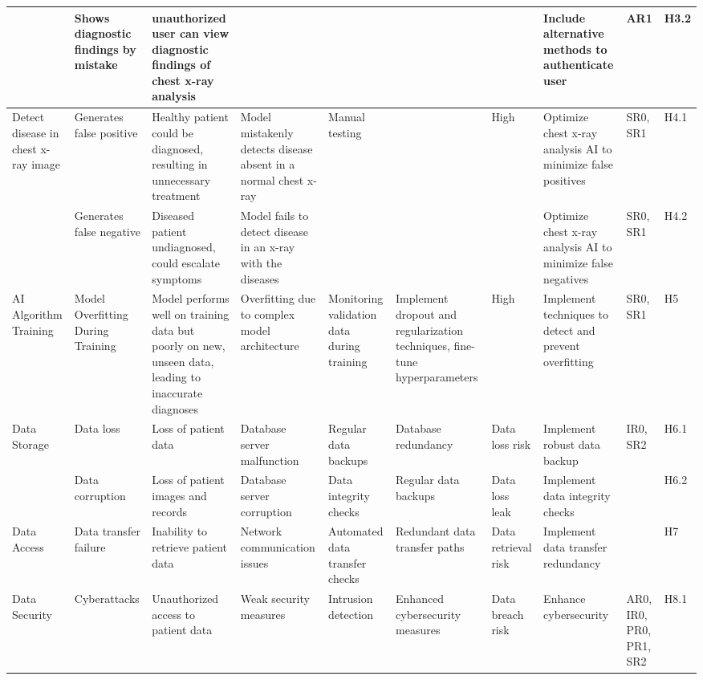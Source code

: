 \documentclass{article}
\begin{document}
\begin{landscape}
\begin{table}[hp]
\begin{footnotesize}
\begin{tabular}{|p{1in}|p{1in}|p{1in}|p{1.5in}|p{0.6in}|p{0.5in}|p{0.3in}|p{2.5in}|p{0.2in}|p{0.2in}|}
        \cline{2-3}\cline{8-10}
        & Shows diagnostic findings by mistake & unauthorized user can view diagnostic findings of chest x-ray analysis & & & & & Include alternative methods to authenticate user & AR1 & H3.2 \\
        \hline
        \multirow{2}{1in}{Detect disease in chest x-ray image} & Generates false positive & Healthy patient could be diagnosed, resulting in unnecessary treatment & Model mistakenly detects disease absent in a normal chest x-ray & \multirow{2}{0.6in}{Manual testing} & & \multirow{2}{0.3in}{High} & Optimize chest x-ray analysis AI to minimize false positives & SR0, SR1 & H4.1 \\
        \cline{2-4}\cline{8-10}
        & Generates false negative & Diseased patient undiagnosed, could escalate symptoms & Model fails to detect disease in an x-ray with the diseases & & & & Optimize chest x-ray analysis AI to minimize false negatives & SR0, SR1 & H4.2 \\
        \hline
        AI Algorithm Training & Model Overfitting During Training & Model performs well on training data but poorly on new, unseen data, leading to inaccurate diagnoses & Overfitting due to complex model architecture & Monitoring validation data during training & Implement dropout and regularization techniques, fine-tune hyperparameters & High & Implement techniques to detect and prevent overfitting & SR0, SR1 & H5 \\
        \hline
        \multirow{2}{1in}{Data Storage} & Data loss & Loss of patient data & Database server malfunction & Regular data backups & Database redundancy & Data loss risk & Implement robust data backup & \multirow{2}{0.2in}{IR0, SR2} & H6.1 \\
        \cline{2-8}\cline{10-10}
        & Data corruption & Loss of patient images and records & Database server corruption & Data integrity checks & Regular data backups & Data loss leak & Implement data integrity checks & & H6.2 \\
        \hline
        Data Access & Data transfer failure & Inability to retrieve patient data & Network communication issues & Automated data transfer checks & Redundant data transfer paths & Data retrieval risk & Implement data transfer redundancy & & H7 \\
        \hline
        \multirow{2}{1in}{Data Security} & Cyberattacks & Unauthorized access to patient data & Weak security measures & \multirow{2}{0.6in}{Intrusion detection} & Enhanced cybersecurity measures & \multirow{2}{0.2in}{Data breach risk} & Enhance cybersecurity & \multirow{2}{0.2in}{AR0, IR0, PR0, PR1, SR2} & H8.1 \\

\end{tabular}
\end{footnotesize}
\end{table}
\end{landscape}
\end{document}
